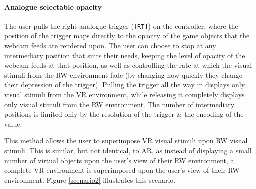 \documentclass[conference]{acmsiggraph}
\begin{document}
\paragraph{Analogue selectable opacity}
The user pulls the right analogue trigger (\texttt{[RT]}) on the controller, where the position of the trigger maps directly to the opacity of the game objects that the webcam feeds are rendered upon. The user can choose to stop at any intermediary position that suits their needs, keeping the level of opacity of the webcam feeds at that position, as well as controlling the rate at which the visual stimuli from the RW environment fade (by changing how quickly they change their depression of the trigger). Pulling the trigger all the way in displays only visual stimuli from the VR environment, while releasing it completely displays only visual stimuli from the RW environment. The number of intermediary positions is limited only by the resolution of the trigger \& the encoding of the value.

This method allows the user to superimpose VR visual stimuli upon RW visual stimuli. This is similar, but not identical, to AR, as instead of displaying a small number of virtual objects upon the user's view of their RW environment, a complete VR environment is superimposed upon the user's view of their RW environment. Figure \ref{scenario2} illustrates this scenario.


\end{document}
